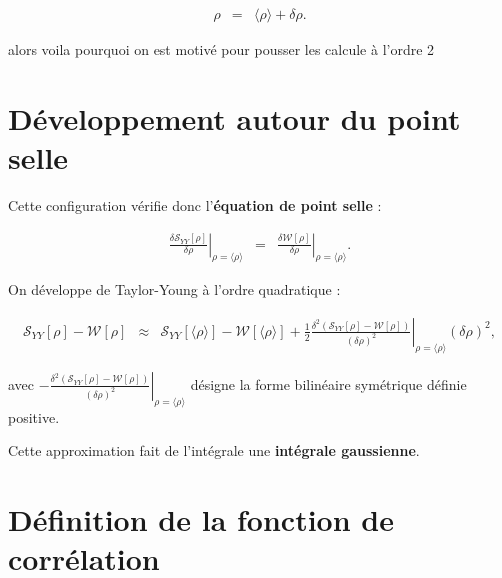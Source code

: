 \begin{eqnarray*}
	 \rho & = &  \langle \rho \rangle + \delta \rho .	
\end{eqnarray*}

alors voila pourquoi on est motivé pour pousser les calcule à l'ordre 2

\section{Développement autour du point selle}

Cette configuration vérifie donc l’{\bf équation de point selle} :

\begin{eqnarray*}
	\left. \frac{\delta \mathcal{S}_{YY}[\rho]}{\delta \rho} \right|_{\rho = \langle \rho \rangle } 	 & = & \left. \frac{\delta \mathcal{W}[\rho]}{\delta \rho} \right|_{\rho = \langle \rho \rangle }.
\end{eqnarray*}

On développe de Taylor-Young à l’ordre quadratique :

\begin{eqnarray*}
	\mathcal{S}_{YY}[\rho] - \mathcal{W}[\rho] & \approx & \mathcal{S}_{YY}[\langle\rho\rangle] - \mathcal{W}[\langle\rho\rangle] + \frac{1}2 \left. \frac{\delta^2 (\mathcal{S}_{YY}[\rho] - \mathcal{W}[\rho]) }{(\delta \rho)^2} \right|_{\rho = \langle \rho \rangle }	(\delta \rho)^2,
	\label{chap:fluctu:eq:action}	
\end{eqnarray*}

avec $-\left. \frac{\delta^2 (\mathcal{S}_{YY}[\rho] - \mathcal{W}[\rho]) }{(\delta \rho)^2} \right|_{\rho = \langle \rho \rangle }$ désigne la forme bilinéaire symétrique définie positive.


Cette approximation fait de l’intégrale une {\bf intégrale gaussienne}.


\section{Définition de la fonction de corrélation}


